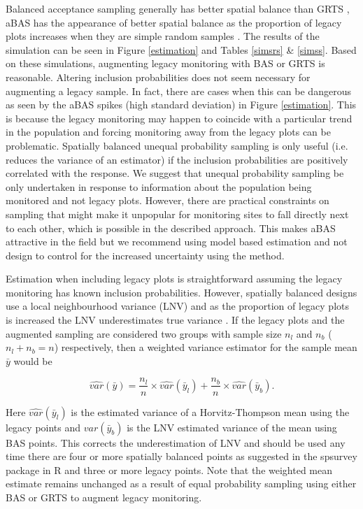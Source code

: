 \documentclass[titlepage]{article}
\begin{document}
Balanced acceptance sampling generally has better spatial balance than GRTS \citep{Robertson2013}, aBAS has the appearance of better spatial balance as the proportion of legacy plots increases when they are simple random samples \citep{Foster2017}. The results of the simulation can be seen in Figure \ref{estimation} and Tables \ref{simsrs} \& \ref{simss}. Based on these simulations, augmenting legacy monitoring with BAS or GRTS is reasonable. Altering inclusion probabilities does not seem necessary for augmenting a legacy sample. In fact, there are cases when this can be dangerous as seen by the aBAS spikes (high standard deviation) in Figure \ref{estimation}. This is because the legacy monitoring may happen to coincide with a particular trend in the population and forcing monitoring away from the legacy plots can be problematic. Spatially balanced unequal probability sampling is only useful (i.e. reduces the variance of an estimator) if the inclusion probabilities are positively correlated with the response. We suggest that unequal probability sampling be only undertaken in response to information about the population being monitored and not legacy plots. However, there are practical constraints on sampling that might make it unpopular for monitoring sites to fall directly next to each other, which is possible in the described approach. This makes aBAS attractive in the field but we recommend using model based estimation and not design to control for the increased uncertainty using the method.

Estimation when including legacy plots is straightforward assuming the legacy monitoring has known inclusion probabilities. However, spatially balanced designs use a local neighbourhood variance (LNV) \citep{StevensOlsen2003} and as the proportion of legacy plots is increased the LNV underestimates true variance \citep{Foster2017}. If the legacy plots and the augmented sampling are considered two groups with sample size $n_l$ and $n_b$ ($n_l + n_b = n$) respectively, then a weighted variance estimator for the sample mean $\bar{y}$ would be

\begin{equation}
	\hat{var}(\bar{y}) = \frac{n_l}{n} \times \hat{var}(\bar{y}_l) + \frac{n_b}{n} \times \hat{var}(\bar{y}_b).
\end{equation}

Here $\hat{var}(\bar{y}_l)$ is the estimated variance of a Horvitz-Thompson mean using the legacy points and $var(\bar{y}_b)$ is the LNV estimated variance of the mean using BAS points. This corrects the underestimation of LNV and should be used any time there are four or more spatially balanced points as suggested in the spsurvey package in R \citep{spsurvey} and three or more legacy points. Note that the weighted mean estimate remains unchanged as a result of equal probability sampling using either BAS or GRTS to augment legacy monitoring.
\end{document}
